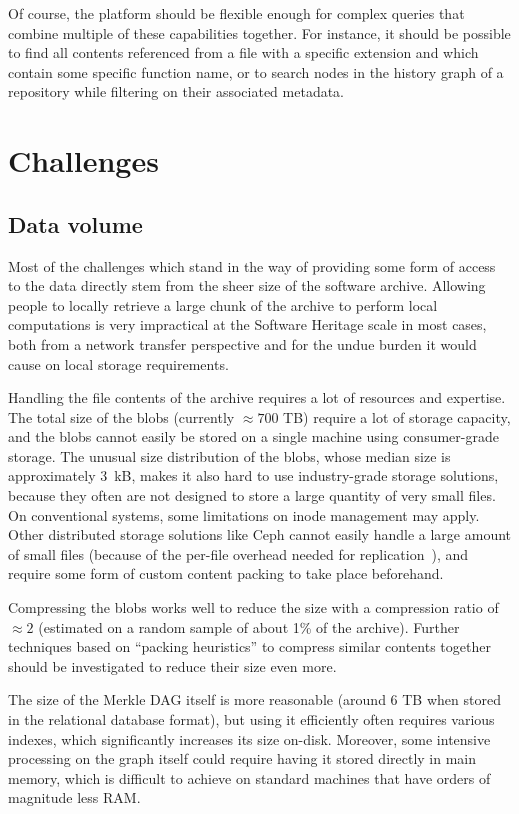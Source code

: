 Of course, the platform should be flexible enough for complex queries that
combine multiple of these capabilities together. For instance, it should be
possible to find all contents referenced from a file with a specific extension
and which contain some specific function name, or to search nodes in the
history graph of a repository while filtering on their associated metadata.

\section{Challenges}

\subsection{Data volume}

Most of the challenges which stand in the way of providing some form of access
to the data directly stem from the sheer size of the software archive. Allowing
people to locally retrieve a large chunk of the archive to perform local
computations is very impractical at the Software Heritage scale in most cases,
both from a network transfer perspective and for the undue burden it would
cause on local storage requirements.

Handling the file contents of the archive requires a lot of resources and
expertise. The total size of the blobs (currently $\approx 700$ TB) require
a lot of storage capacity, and the blobs cannot easily be stored on a single
machine using consumer-grade storage. The unusual size distribution of the
blobs, whose median size is approximately 3~kB, makes it also hard to use
industry-grade storage solutions, because they often are not designed to store
a large quantity of very small files. On conventional systems, some limitations
on inode management may apply. Other distributed storage solutions like Ceph
cannot easily handle a large amount of small files (because of the per-file
overhead needed for replication~\cite{dandrimont2018cephml}), and require some
form of custom content packing to take place beforehand.

Compressing the blobs works well to reduce the size with a compression
ratio of $\approx 2$ (estimated on a random sample of about 1\% of the
archive). Further techniques based on ``packing heuristics'' to compress
similar contents together should be investigated to reduce their size even
more.

The size of the Merkle DAG itself is more reasonable (around 6 TB when stored
in the relational database format), but using it efficiently often requires
various indexes, which significantly increases its size on-disk.  Moreover,
some intensive processing on the graph itself could require having it stored
directly in main memory, which is difficult to achieve on standard machines
that have orders of magnitude less RAM.\@

